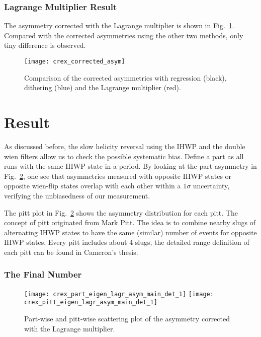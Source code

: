 \subsubsection{Lagrange Multiplier Result}
The asymmetry corrected with the Lagrange multiplier is shown in 
Fig.~\ref{fig:crex_corrected_asym}. Compared with the corrected asymmetries using
the other two methods, only tiny difference is observed.
\begin{figure}[!h]
    \centering
    \texttt{[image: crex\_corrected\_asym]}
    \caption{Comparison of the corrected asymmetries with regression (black), 
    dithering (blue) and the Lagrange multiplier (red).}
    \label{fig:crex_corrected_asym}
\end{figure}

\section{Result}
As discussed before, the slow helicity reversal using the IHWP and the 
double wien filters allow us to check the possible systematic bias. 
Define a part as all runs with the same IHWP state in a period. 
By looking at the part asymmetry in Fig.~\ref{fig:crex_part_pitt}, 
one see that asymmetries measured with 
opposite IHWP states or opposite wien-flip states overlap
with each other within a $1\sigma$ uncertainty, verifying the unbiasedness of our
measurement.

The pitt plot in Fig.~\ref{fig:crex_part_pitt} shows the asymmetry distribution
for each pitt. The concept of pitt originated from Mark Pitt. The idea is to combine
nearby slugs of alternating IHWP states to have the same (similar) number of events for 
opposite IHWP states. Every pitt includes about 4 slugs, the detailed range definition
of each pitt can be found in Cameron's thesis.

\subsubsection{The Final Number}
\begin{figure}
    \centering
    \texttt{[image: crex\_part\_eigen\_lagr\_asym\_main\_det\_1]}
    \texttt{[image: crex\_pitt\_eigen\_lagr\_asym\_main\_det\_1]}
    \caption{Part-wise and pitt-wise scattering plot of the asymmetry 
    corrected with the Lagrange multiplier.}
    \label{fig:crex_part_pitt}
\end{figure}


